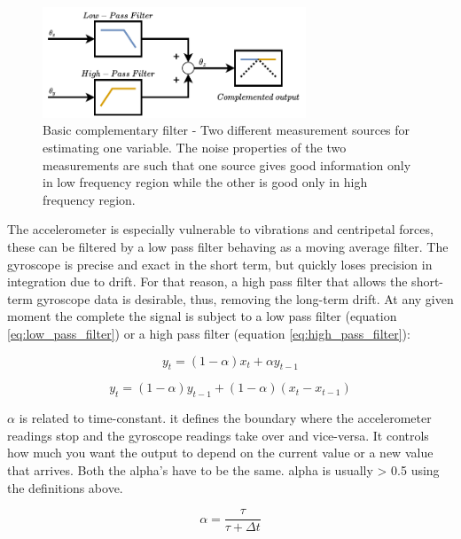 \begin{figure}[!h]
    \centering
    \includegraphics[width=0.7\textwidth]{figures/complementary.pdf}
    \caption{Basic complementary filter \cite{higgins1975comparison} - Two different measurement sources for estimating one variable. The noise properties of the two measurements are such that one source gives good information only in low frequency region while the other is good only in high frequency region. }
    \label{fig:complementary}
\end{figure}

The accelerometer is especially vulnerable to vibrations and centripetal forces, these can be filtered by a low pass filter behaving as a moving average filter. The gyroscope is precise and exact in the short term, but quickly loses precision in integration due to drift. For that reason, a high pass filter that allows the short-term gyroscope data is desirable, thus, removing the long-term drift.
At any given moment the complete the signal is subject to a low pass filter (equation \ref{eq:low_pass_filter}) or a high pass filter (equation \ref{eq:high_pass_filter}):

\begin{equation}
    y_t = (1-\alpha)x_{t} + \alpha y_{t-1}
    \label{eq:low_pass_filter}
\end{equation}

\begin{equation}
    y_t = (1-\alpha)y_{t-1} + (1-\alpha) (x_t - x_{t-1})
    \label{eq:high_pass_filter}
\end{equation}

$\alpha$ is related to time-constant. it defines the boundary where the accelerometer readings stop and the gyroscope readings take over and vice-versa. It controls how much you want the output to depend on the current value or a new value that arrives. Both the alpha’s have to be the same. alpha is usually > 0.5 using the definitions above.


\begin{equation}
    \alpha = \frac{\tau}{\tau + \Delta t}
\end{equation}

